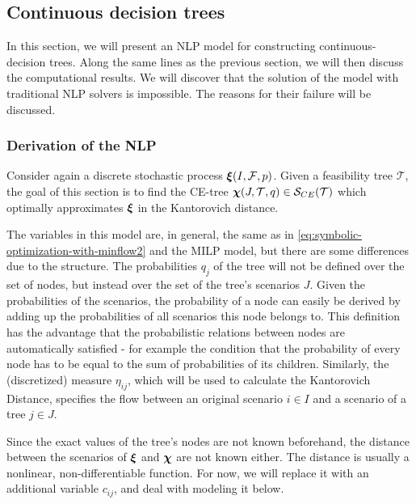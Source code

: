\subsection{Continuous decision trees}
\label{sec:naive-cont-decis-trees}
In this  section, we will present an NLP model for constructing continuous-decision trees.
Along the same lines as the previous section, we will then discuss the computational results.
We will discover that the solution of the model with traditional NLP solvers is impossible.
The reasons for their failure will be discussed.
\subsubsection{Derivation of the NLP}
Consider again a discrete stochastic process $\boldsymbol\xi(I,\mathcal{F},p)$.
Given a feasibility tree $\mathcal{T}$, the goal of this section is to find the CE-tree $\boldsymbol\chi(J,\mathcal{T}, q)\in\mathcal{S}_{CE}(\mathcal{T})$ which optimally approximates $\boldsymbol\xi$ in the Kantorovich distance.

The variables in this model are, in general, the same as in \eqref{eq:symbolic-optimization-with-minflow2} and the MILP model, but there are some differences due to the structure.
The probabilities $q_j$ of the tree will not be defined over the set of nodes, but instead over the set of the tree's scenarios $J$.
Given the probabilities of the scenarios, the probability of a node can easily be derived by adding up the probabilities of all scenarios this node belongs to.
This definition has the advantage that the probabilistic relations between nodes are automatically satisfied - for example the condition that the probability of every node has to be equal to the sum of probabilities of its children.
Similarly, the (discretized) measure $\eta_{ij}$, which will be used to calculate the Kantorovich Distance, specifies the flow between an original scenario $i \in I$ and a scenario of a tree $j \in J$.

Since the exact values of the tree's nodes are not known beforehand, the distance between the scenarios of $\boldsymbol\xi$ and $\boldsymbol\chi$ are not known either.
The distance is usually a nonlinear, non-differentiable function.
For now, we will replace it with an additional variable $c_{ij}$, and deal with modeling it below.

